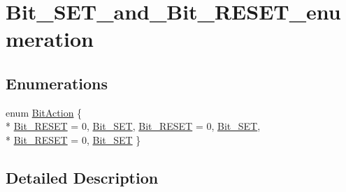 \hypertarget{group___bit___s_e_t__and___bit___r_e_s_e_t__enumeration}{\section{Bit\-\_\-\-S\-E\-T\-\_\-and\-\_\-\-Bit\-\_\-\-R\-E\-S\-E\-T\-\_\-enumeration}
\label{group___bit___s_e_t__and___bit___r_e_s_e_t__enumeration}
}
\subsection*{Enumerations}
\begin{DoxyCompactItemize}
\item 
enum \hyperlink{group___bit___s_e_t__and___bit___r_e_s_e_t__enumeration_ga176130b21c0e719121470a6042d4cf19}{Bit\-Action} \{ \\*
\hyperlink{group___bit___s_e_t__and___bit___r_e_s_e_t__enumeration_ga176130b21c0e719121470a6042d4cf19ae2c026f2b44a949f82a65f3385edef09}{Bit\-\_\-\-R\-E\-S\-E\-T} = 0, 
\hyperlink{group___bit___s_e_t__and___bit___r_e_s_e_t__enumeration_ga176130b21c0e719121470a6042d4cf19a3c477841a6ceec13fe47ef322432b992}{Bit\-\_\-\-S\-E\-T}, 
\hyperlink{group___bit___s_e_t__and___bit___r_e_s_e_t__enumeration_ga176130b21c0e719121470a6042d4cf19ae2c026f2b44a949f82a65f3385edef09}{Bit\-\_\-\-R\-E\-S\-E\-T} = 0, 
\hyperlink{group___bit___s_e_t__and___bit___r_e_s_e_t__enumeration_ga176130b21c0e719121470a6042d4cf19a3c477841a6ceec13fe47ef322432b992}{Bit\-\_\-\-S\-E\-T}, 
\\*
\hyperlink{group___bit___s_e_t__and___bit___r_e_s_e_t__enumeration_ga176130b21c0e719121470a6042d4cf19ae2c026f2b44a949f82a65f3385edef09}{Bit\-\_\-\-R\-E\-S\-E\-T} = 0, 
\hyperlink{group___bit___s_e_t__and___bit___r_e_s_e_t__enumeration_ga176130b21c0e719121470a6042d4cf19a3c477841a6ceec13fe47ef322432b992}{Bit\-\_\-\-S\-E\-T}
 \}
\end{DoxyCompactItemize}


\subsection{Detailed Description}


